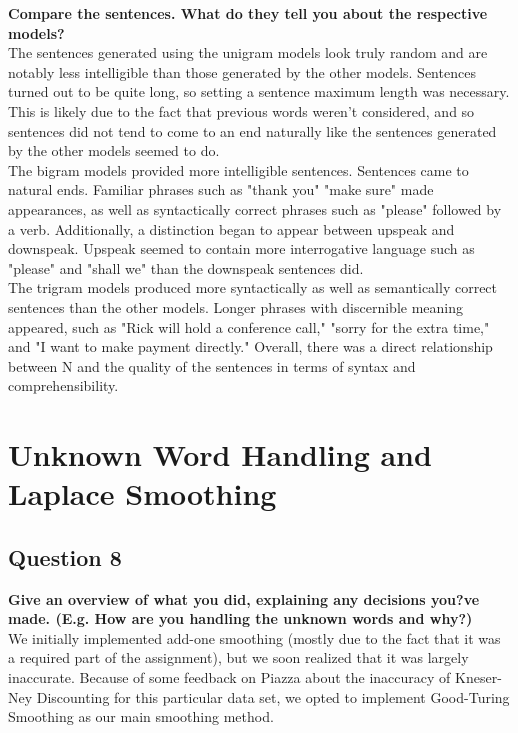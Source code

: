 \documentclass{article} %
\begin{document}
\textbf{Compare the sentences. What do they tell you about the respective models?}
\\

The sentences generated using the unigram models look truly random and are notably less intelligible than those generated by the other models. Sentences turned out to be quite long, so setting a sentence maximum length was necessary. This is likely due to the fact that previous words weren't considered, and so sentences did not tend to come to an end naturally like the sentences generated by the other models seemed to do. \\

The bigram models provided more intelligible sentences. Sentences came to natural ends. Familiar phrases such as "thank you" "make sure" made appearances, as well as syntactically correct phrases such as "please" followed by a verb. Additionally, a distinction began to appear between upspeak and downspeak. Upspeak seemed to contain more interrogative language such as "please" and "shall we" than the downspeak sentences did.\\

The trigram models produced more syntactically as well as semantically correct sentences than the other models. Longer phrases with discernible meaning appeared, such as "Rick will hold a conference call," "sorry for the extra time," and "I want to make payment directly." Overall, there was a direct relationship between N and the quality of the sentences in terms of syntax and comprehensibility.


\section{Unknown Word Handling and Laplace Smoothing}

\subsection*{Question 8}

\textbf{Give an overview of what you did, explaining any decisions you?ve made. (E.g. How are you handling the unknown words and why?)}
\\

We initially implemented add-one smoothing (mostly due to the fact that it was a required part of the assignment), but we soon realized that it was largely inaccurate. Because of some feedback on Piazza about the inaccuracy of Kneser-Ney Discounting for this particular data set, we opted to implement Good-Turing Smoothing as our main smoothing method.\\
\end{document}
